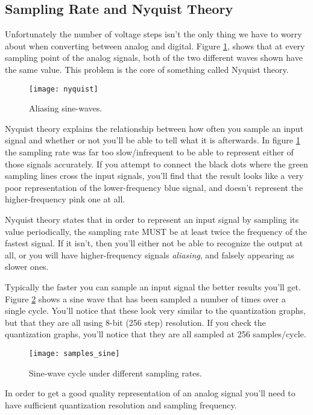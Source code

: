 \documentclass[openany,11pt,fleqn]{book} %
\begin{document}
\subsection{Sampling Rate and Nyquist Theory}
Unfortunately the number of voltage steps isn't the only thing we have to worry about when converting between analog and digital. Figure \ref{nyquist}, shows that at every sampling point of the analog signals, both of the two different waves shown have the same value. This problem is the core of something called Nyquist theory.

\begin{figure}[]
    \centering\texttt{[image: nyquist]}
    \caption{Aliasing sine-waves.}
    \label{nyquist}
\end{figure}

Nyquist theory explains the relationship between how often you sample an input signal and whether or not you'll be able to tell what it is afterwards. In figure \ref{nyquist} the sampling rate was far too slow/infrequent to be able to represent either of those signals accurately. If you attempt to connect the black dots where the green sampling lines cross the input signals, you'll find that the result looks like a very poor representation of the lower-frequency blue signal, and doesn't represent the higher-frequency pink one at all. 

Nyquist theory states that in order to represent an input signal by sampling its value periodically, the sampling rate MUST be at least twice the frequency of the fastest signal. If it isn't, then you'll either not be able to recognize the output at all, or you will have higher-frequency signals \textit{aliasing}, and falsely appearing as slower ones.

Typically the faster you can sample an input signal the better results you'll get. Figure \ref{samples_sine} shows a sine wave that has been sampled a number of times over a single cycle. You'll notice that these look very similar to the quantization graphs, but that they are all using 8-bit (256 step) resolution. If you check the quantization graphs, you'll notice that they are all sampled at 256 samples/cycle. 

\begin{figure}[]
    \centering\texttt{[image: samples\_sine]}
    \caption{Sine-wave cycle under different sampling rates.}
    \label{samples_sine}
\end{figure}

 In order to get a good quality representation of an analog signal you'll need to have sufficient quantization resolution and sampling frequency. 
 
\end{document}
